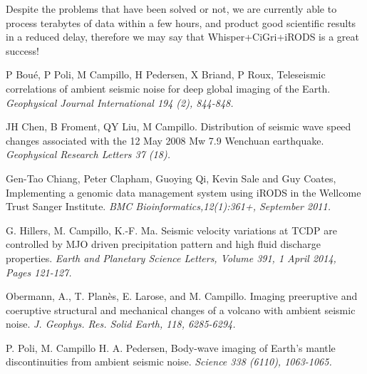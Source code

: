 \documentclass[a4paper, 10pt]{article}
\begin{document}
\begin{multicols}{2}
Despite the problems that have been solved or not, we are currently able to process terabytes of data within a few hours, and product good scientific results in a reduced delay, therefore we may say that Whisper+CiGri+iRODS is a great success!

\begin{thebibliography}{9}

P Bou\'e, P Poli, M Campillo, H Pedersen, X Briand, P Roux,
Teleseismic correlations of ambient seismic noise for deep global imaging of the Earth.
{\em Geophysical Journal International 194 (2), 844-848.}

JH Chen, B Froment, QY Liu, M Campillo.
Distribution of seismic wave speed changes associated with the 12 May 2008 Mw 7.9 Wenchuan earthquake.
{\em Geophysical Research Letters 37 (18).}

 Gen-Tao Chiang, Peter Clapham, Guoying Qi, Kevin Sale and Guy Coates,
 Implementing a genomic data management system using iRODS in the Wellcome Trust Sanger Institute.
{\em BMC Bioinformatics,12(1):361+, September 2011.}

G. Hillers, M. Campillo, K.-F. Ma.
Seismic velocity variations at TCDP are controlled by MJO driven precipitation pattern and high fluid discharge properties.
{\em Earth and Planetary Science Letters, Volume 391, 1 April 2014, Pages 121-127.}

Obermann, A., T. Plan\`es, E. Larose, and M. Campillo.
Imaging preeruptive and coeruptive structural and mechanical changes of a volcano with ambient seismic noise.
{\em J. Geophys. Res. Solid Earth, 118, 6285-6294. }

P. Poli, M. Campillo H. A. Pedersen,
Body-wave imaging of Earth's mantle discontinuities from ambient seismic noise.
{\em Science 338 (6110), 1063-1065.}


\end{thebibliography}

\end{multicols}
\end{document}
